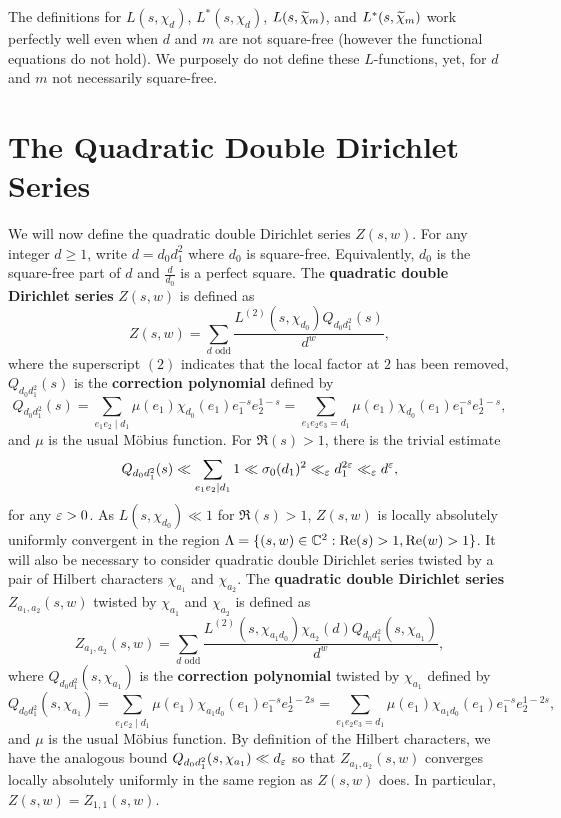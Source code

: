 \documentclass[12pt,reqno,oneside]{amsart}
\begin{document}
    \begin{remark}
        The definitions for $L(s,\chi_{d})$, $L^{\ast}(s,\chi_{d})$, $L(s,\widetilde{\chi}_{m})$, and $L^{\ast}(s,\widetilde{\chi}_{m})$ work perfectly well even when $d$ and $m$ are not square-free (however the functional equations do not hold). We purposely do not define these $L$-functions, yet, for $d$ and $m$ not necessarily square-free.
    \end{remark}
\section*{The Quadratic Double Dirichlet Series}
    We will now define the quadratic double Dirichlet series $Z(s,w)$. For any integer $d \ge 1$, write $d = d_{0}d_{1}^{2}$ where $d_{0}$ is square-free. Equivalently, $d_{0}$ is the square-free part of $d$ and $\frac{d}{d_{0}}$ is a perfect square. The \textbf{quadratic double Dirichlet series} $Z(s,w)$ is defined as
    \[
        Z(s,w) = \sum_{\text{$d$ odd}}\frac{L^{(2)}(s,\chi_{d_{0}})Q_{d_{0}d_{1}^{2}}(s)}{d^{w}},
    \]
    where the superscript $(2)$ indicates that the local factor at $2$ has been removed, $Q_{d_{0}d_{1}^{2}}(s)$ is the \textbf{correction polynomial} defined by
    \[
        Q_{d_{0}d_{1}^{2}}(s) = \sum_{e_{1}e_{2} \mid d_{1}}\mu(e_{1})\chi_{d_{0}}(e_{1})e_{1}^{-s}e_{2}^{1-s} = \sum_{e_{1}e_{2}e_{3} = d_{1}}\mu(e_{1})\chi_{d_{0}}(e_{1})e_{1}^{-s}e_{2}^{1-s},
    \]
    and $\mu$ is the usual M\"obius function. For $\Re(s) > 1$, there is the trivial estimate
    \[
        Q_{d_{0}d_{1}^{2}}(s) \ll \sum_{e_{1}e_{2} \mid d_{1}}1 \ll \sigma_{0}(d_{1})^{2} \ll_{\varepsilon} d_{1}^{2\varepsilon} \ll_{\varepsilon} d^{\varepsilon},
    \]
     for any $\varepsilon > 0$. As $L(s,\chi_{d_{0}}) \ll 1$ for $\Re(s) > 1$, $Z(s,w)$ is locally absolutely uniformly convergent in the region $\Lambda = \{(s,w) \in \mathbb{C}^{2}:\mathrm{Re}(s) > 1, \mathrm{Re}(w) > 1\}$. It will also be necessary to consider quadratic double Dirichlet series twisted by a pair of Hilbert characters $\chi_{a_{1}}$ and $\chi_{a_{2}}$. The \textbf{quadratic double Dirichlet series} $Z_{a_{1},a_{2}}(s,w)$ twisted by $\chi_{a_{1}}$ and $\chi_{a_{2}}$ is defined as
    \[
        Z_{a_{1},a_{2}}(s,w) = \sum_{\text{$d$ odd}}\frac{L^{(2)}(s,\chi_{a_{1}d_{0}})\chi_{a_{2}}(d)Q_{d_{0}d_{1}^{2}}(s,\chi_{a_{1}})}{d^{w}},
    \]
    where $Q_{d_{0}d_{1}^{2}}(s,\chi_{a_{1}})$ is the \textbf{correction polynomial} twisted by $\chi_{a_{1}}$ defined by
    \[
        Q_{d_{0}d_{1}^{2}}(s,\chi_{a_{1}}) = \sum_{e_{1}e_{2} \mid d_{1}}\mu(e_{1})\chi_{a_{1}d_{0}}(e_{1})e_{1}^{-s}e_{2}^{1-2s} = \sum_{e_{1}e_{2}e_{3} = d_{1}}\mu(e_{1})\chi_{a_{1}d_{0}}(e_{1})e_{1}^{-s}e_{2}^{1-2s},
    \]
    and $\mu$ is the usual M\"obius function. By definition of the Hilbert characters, we have the analogous bound $Q_{d_{0}d_{1}^{2}}(s,\chi_{a_{1}}) \ll d_{\varepsilon}$ so that $Z_{a_{1},a_{2}}(s,w)$ converges locally absolutely uniformly in the same region as $Z(s,w)$ does. In particular, $Z(s,w) = Z_{1,1}(s,w)$.
\end{document}
